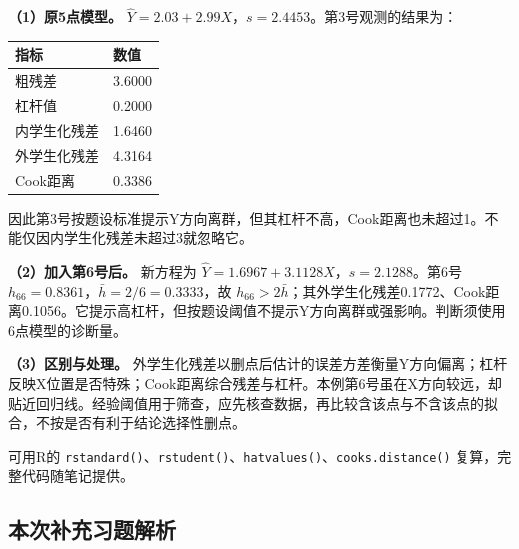 
\textbf{（1）原5点模型。} \(\hat Y=2.03+2.99X\)，\(s=2.4453\)。第3号观测的结果为：

\begin{center}\small\setlength{\tabcolsep}{5pt}\renewcommand{\arraystretch}{1.18}\begin{tabular}{@{}ll@{}}
\toprule
指标 & 数值 \\
\midrule

粗残差 & 3.6000 \\
杠杆值 & 0.2000 \\
内学生化残差 & 1.6460 \\
外学生化残差 & 4.3164 \\
Cook距离 & 0.3386 \\
\bottomrule\end{tabular}\end{center}

因此第3号按题设标准提示Y方向离群，但其杠杆不高，Cook距离也未超过1。不能仅因内学生化残差未超过3就忽略它。

\textbf{（2）加入第6号后。} 新方程为 \(\hat Y=1.6967+3.1128X\)，\(s=2.1288\)。第6号 \(h_{66}=0.8361\)，\(\bar h=2/6=0.3333\)，故 \(h_{66}>2\bar h\)；其外学生化残差0.1772、Cook距离0.1056。它提示高杠杆，但按题设阈值不提示Y方向离群或强影响。判断须使用6点模型的诊断量。

\textbf{（3）区别与处理。} 外学生化残差以删点后估计的误差方差衡量Y方向偏离；杠杆反映X位置是否特殊；Cook距离综合残差与杠杆。本例第6号虽在X方向较远，却贴近回归线。经验阈值用于筛查，应先核查数据，再比较含该点与不含该点的拟合，不按是否有利于结论选择性删点。

可用R的 \texttt{rstandard()}、\texttt{rstudent()}、\texttt{hatvalues()}、\texttt{cooks.distance()} 复算，完整代码随笔记提供。
\subsection*{本次补充习题解析}

\EndExercises
